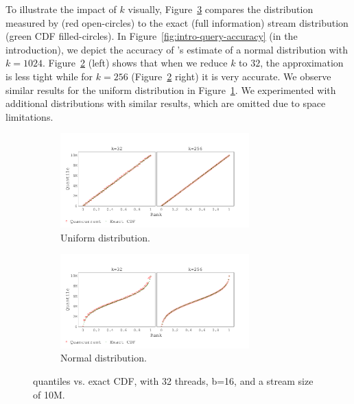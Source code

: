 To illustrate the impact of $k$ visually, Figure~\ref{fig:cdf} compares the distribution measured by \mysketch (red open-circles) to the exact (full information) stream distribution (green CDF filled-circles). In Figure~\ref{fig:intro-query-accuracy} (in the introduction), we depict the accuracy of \mysketch's estimate of a normal distribution with $k=1024$. Figure~\ref{fig:cdf_normal} (left) shows that when we reduce $k$ to $32$, the approximation is less tight while for $k=256$ (Figure~\ref{fig:cdf_normal} right) it is very accurate. We observe similar results for the uniform distribution in Figure~\ref{fig:cdf_uniform}. We experimented with additional distributions with similar results, which are omitted due to space limitations. 

\begin{figure}[h!]
\centering
    \begin{subfigure}[]{\textwidth}
        \centering
        \includegraphics[width=0.8\textwidth,trim={0.1cm 0.2cm 1.5cm 1cm},clip]
        {graphics/graphs/accuracy/Oracle_Quancurrent_blocking_numa_cdf_uniform_ks_32_256_b16_keys10M_runs1_uT_32_qT1_snapshot1_15-08-2022_07-25-54.pdf}
        \caption{Uniform distribution.} \label{fig:cdf_uniform}
    \end{subfigure}
    
    \begin{subfigure}[]{\textwidth}
        \centering
        \includegraphics[width=0.8\textwidth,trim={0.1cm 0.2cm 1.5cm 1cm},clip]
        {graphics/graphs/accuracy/Oracle_Quancurrent_blocking_numa_cdf_normal_ks_32_256_b16_keys10M_runs1_uT_32_qT1_snapshot1_15-08-2022_07-25-54.pdf}
        \caption{Normal distribution.} \label{fig:cdf_normal}
    \end{subfigure}

\caption{\mysketch quantiles vs. exact CDF, with 32 threads, b=16, and a stream size of 10M.} \label{fig:cdf}
\end{figure}

